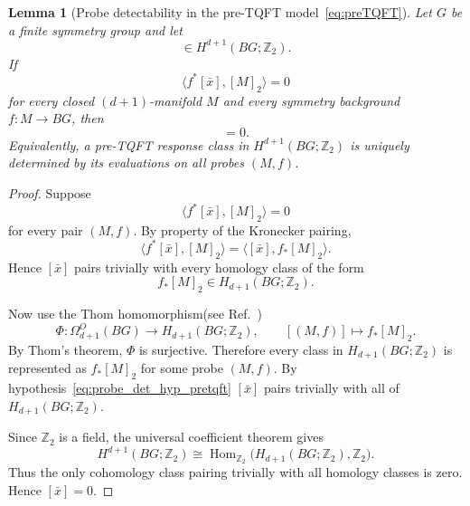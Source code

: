 \documentclass[aps,prx,reprint,superscriptaddress,twocolumn,amsmath,amssymb,amsfonts, nofootinbib]{revtex4-2}
\theoremstyle{apsstyle}
\newtheorem{lemma}{Lemma}
\begin{document}
\begin{lemma}[Probe detectability in the pre-TQFT model~\eqref{eq:preTQFT}]
\label{lemma:probe_pretqft}
Let $G$ be a finite symmetry group and let
\begin{equation*}
[\bar x]\in H^{d+1}(BG;\mathbb Z_2).
\end{equation*}
If
\begin{equation*}
\langle f^*[\bar x],[M]_2\rangle=0
\end{equation*}
for every closed $(d+1)$-manifold $M$ and every symmetry background $f:M\to BG$, then
\begin{equation*}
[\bar x]=0.
\end{equation*}
Equivalently, a pre-TQFT response class in $H^{d+1}(BG;\mathbb Z_2)$ is uniquely determined by its evaluations on all probes $(M,f)$.
\end{lemma}

\begin{proof}
Suppose
\begin{equation}
\langle f^*[\bar x],[M]_2\rangle=0
\label{eq:probe_det_hyp_pretqft}
\end{equation}
for every pair $(M,f)$. By property of the Kronecker pairing,
\begin{equation*}
\langle f^*[\bar x],[M]_2\rangle = \langle [\bar x],f_*[M]_2\rangle.
\end{equation*}
Hence $[\bar x]$ pairs trivially with every homology class of the form
\begin{equation*}
f_*[M]_2\in H_{d+1}(BG;\mathbb Z_2).
\end{equation*}

\noindent Now use the Thom homomorphism(see Ref.~\cite{Thom1954})
\begin{equation*}
\Phi:\Omega^{O}_{d+1}(BG)\longrightarrow H_{d+1}(BG;\mathbb Z_2),
\qquad [(M,f)]\longmapsto f_*[M]_2.
\end{equation*}
By Thom's theorem, $\Phi$ is surjective. Therefore every class in
$H_{d+1}(BG;\mathbb Z_2)$ is represented as $f_*[M]_2$ for some probe $(M,f)$. By hypothesis~\eqref{eq:probe_det_hyp_pretqft} $[\bar x]$ pairs trivially with all of $H_{d+1}(BG;\mathbb Z_2)$.

\bigskip 

\noindent Since $\mathbb Z_2$ is a field, the universal coefficient theorem gives
\begin{equation*}
H^{d+1}(BG;\mathbb Z_2) \cong \operatorname{Hom}_{\mathbb Z_2}
\bigl(H_{d+1}(BG;\mathbb Z_2),\mathbb Z_2\bigr).
\end{equation*}
Thus the only cohomology class pairing trivially with all homology classes is
zero. Hence $[\bar x]=0$.
\end{proof}
\end{document}
